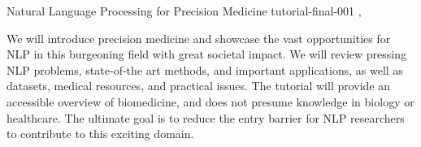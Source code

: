 \begin{bio}
\end{bio}

\begin{tutorial}
  {Natural Language Processing for Precision Medicine}
  {tutorial-final-001}
  {\daydateyear, \tutorialmorningtime}
  {\TutLocA}

We will introduce precision medicine and showcase the vast opportunities for NLP in this burgeoning field with great societal impact. We will review pressing NLP problems, state-of-the art methods, and important applications, as well as datasets, medical resources, and practical issues. The tutorial will provide an accessible overview of biomedicine, and does not presume knowledge in biology or healthcare. The ultimate goal is to reduce the entry barrier for NLP researchers to contribute to this exciting domain.
\end{tutorial}
